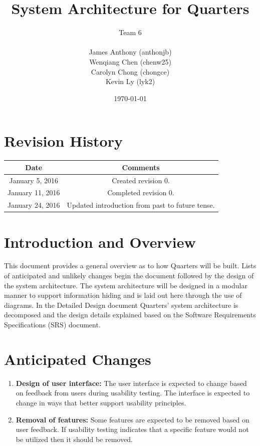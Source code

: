 \documentclass[12pt]{article}
\begin{document}
\title{System Architecture for Quarters}
\author{Team 6\\ \\James Anthony (anthonjb)\\ Wenqiang Chen (chenw25)\\ Carolyn Chong
(chongce)\\ Kevin Ly (lyk2)}
\date{\today}

\maketitle

\pagebreak

\tableofcontents
\listoffigures

\section*{Revision History}
\begin{tabular}{|c|c|}
\hline
\textbf{Date}  & \textbf{Comments} \\ \hline
January 5, 2016 & Created revision 0. \\ \hline
January 11, 2016 & Completed revision 0. \\
\hline
January 24, 2016 & Updated introduction from past to future tense. \\
\hline
\end{tabular}

\pagebreak


\section{Introduction and Overview}
This document provides a general overview as to how Quarters will be built. Lists of anticipated and unlikely changes begin the document followed by the design of the system architecture. The system architecture will be designed in a modular manner to support information hiding and is laid out here through the use of diagrams. In the Detailed Design document Quarters' system architecture is decomposed and the design details explained based on the Software Requirements Specifications (SRS) document.

\section{Anticipated Changes}
\begin{enumerate}
  \item \textbf{Design of user interface:} The user interface is expected to change based on feedback from users during usability testing. The interface is expected to change in ways that better support usability principles.
  \item \textbf{Removal of features:} Some features are expected to be removed based on user feedback. If usability testing indicates that a specific feature would not be utilized then it should be removed.
\end{enumerate}
\end{document}
